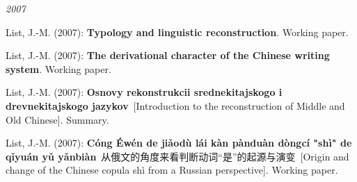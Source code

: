 \par
\noindent\textit{2007}\par\nopagebreak\vspace{0.25cm}
\nopagebreak\noindent List, J.-M. (2007): \textbf{Typology and linguistic reconstruction}. Working paper.\vspace{0.25cm}
\par
\nopagebreak\noindent List, J.-M. (2007): \textbf{The derivational character of the Chinese writing system}. Working paper.\vspace{0.25cm}
\par
\nopagebreak\noindent List, J.-M. (2007): \textbf{Osnovy rekonstrukcii srednekitajskogo i drevnekitajskogo jazykov}\ [Introduction to the reconstruction of Middle and Old Chinese]. Summary.\vspace{0.25cm}
\par
\nopagebreak\noindent List, J.-M. (2007): \textbf{Cóng Éwén de jiǎodù lái kàn pànduàn dòngcí "shì" de qǐyuán yǔ yǎnbiàn}\ {\hana 从俄文的角度来看判断动词“是”的起源与演变}\ [Origin and change of the Chinese copula shì from a Russian perspective]. Working paper.\vspace{0.25cm}
\par
